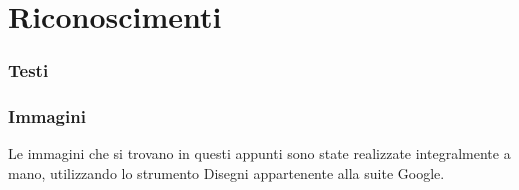 \section*{Riconoscimenti}

\subsubsection*{Testi}

\subsubsection*{Immagini}
Le immagini che si trovano in questi appunti sono state realizzate
integralmente a mano, utilizzando lo strumento Disegni appartenente
alla suite Google.